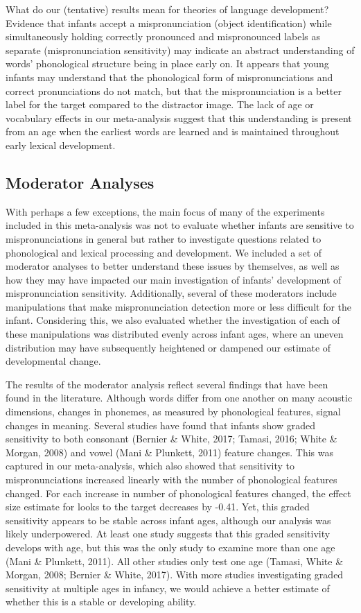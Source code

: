 \documentclass[man]{apa6}
\theoremstyle{definition}
\theoremstyle{definition}
\theoremstyle{definition}
\theoremstyle{remark}
\begin{document}
What do our (tentative) results mean for theories of language
development? Evidence that infants accept a mispronunciation (object
identification) while simultaneously holding correctly pronounced and
mispronounced labels as separate (mispronunciation sensitivity) may
indicate an abstract understanding of words' phonological structure
being in place early on. It appears that young infants may understand
that the phonological form of mispronunciations and correct
pronunciations do not match, but that the mispronunciation is a better
label for the target compared to the distractor image. The lack of age
or vocabulary effects in our meta-analysis suggest that this
understanding is present from an age when the earliest words are learned
and is maintained throughout early lexical development.

\subsection{Moderator Analyses}\label{moderator-analyses-1}

With perhaps a few exceptions, the main focus of many of the experiments
included in this meta-analysis was not to evaluate whether infants are
sensitive to mispronunciations in general but rather to investigate
questions related to phonological and lexical processing and
development. We included a set of moderator analyses to better
understand these issues by themselves, as well as how they may have
impacted our main investigation of infants' development of
mispronunciation sensitivity. Additionally, several of these moderators
include manipulations that make mispronunciation detection more or less
difficult for the infant. Considering this, we also evaluated whether
the investigation of each of these manipulations was distributed evenly
across infant ages, where an uneven distribution may have subsequently
heightened or dampened our estimate of developmental change.

The results of the moderator analysis reflect several findings that have
been found in the literature. Although words differ from one another on
many acoustic dimensions, changes in phonemes, as measured by
phonological features, signal changes in meaning. Several studies have
found that infants show graded sensitivity to both consonant (Bernier \&
White, 2017; Tamasi, 2016; White \& Morgan, 2008) and vowel (Mani \&
Plunkett, 2011) feature changes. This was captured in our meta-analysis,
which also showed that sensitivity to mispronunciations increased
linearly with the number of phonological features changed. For each
increase in number of phonological features changed, the effect size
estimate for looks to the target decreases by -0.41. Yet, this graded
sensitivity appears to be stable across infant ages, although our
analysis was likely underpowered. At least one study suggests that this
graded sensitivity develops with age, but this was the only study to
examine more than one age (Mani \& Plunkett, 2011). All other studies
only test one age (Tamasi, White \& Morgan, 2008; Bernier \& White,
2017). With more studies investigating graded sensitivity at multiple
ages in infancy, we would achieve a better estimate of whether this is a
stable or developing ability.
\end{document}
